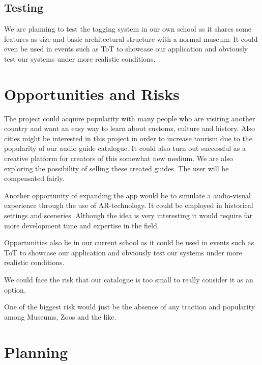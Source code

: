 \documentclass[12pt]{article}
\theoremstyle{definition}
\newenvironment{text}{
}{}
\begin{document}
\subsection{Testing}
\begin{text}
We are planning to test the tagging system in our own school as it shares some features as size and basic architectural structure with a normal museum. It could even be used in events such as ToT to showcase our application and obviously test our systems under more realistic conditions.\newline
\end{text}
 
\pagebreak
\section{Opportunities and Risks}
\begin{text}
The project could acquire popularity with many people who are visiting another country and want an easy way to learn about customs, culture and history.
Also cities might be interested in this project in order to increase tourism due to the popularity of our audio guide catalogue.
It could also turn out successful as a creative platform for creators of this somewhat new medium. We are also exploring the possibility of selling these created guides. The user will be compensated fairly.\newline
 
Another opportunity of expanding the app would be to simulate a audio-visual experience through the use of AR-technology. It could be employed in historical settings and sceneries. Although the idea is very interesting it would require far more development time and expertise in the field.\newline

Opportunities also lie in our current school as it could be used in events such as ToT to showcase our application and obviously test our systems under more realistic conditions.
 
We could face the risk that our catalogue is too small to really consider it as an option.\newline 
 
One of the biggest risk would just be the absence of any traction and popularity among Museums, Zoos and the like. \newline
 
\end{text}
 
\pagebreak
\section{Planning}
\end{document}
